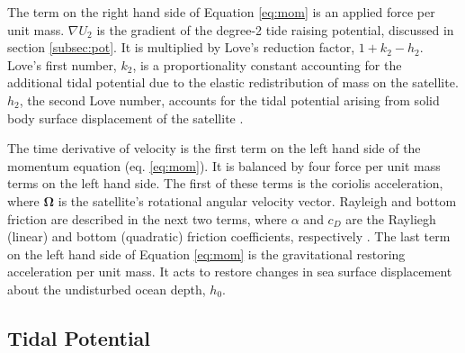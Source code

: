 The term on the right hand side of Equation \ref{eq:mom} is an applied force per unit mass. $\nabla U_2$ is the gradient of the degree-2 tide raising potential, discussed in section \ref{subsec:pot}. It is multiplied by Love's reduction factor, $1 + k_2 - h_2$. Love's first number, $k_2$, is a proportionality constant accounting for the additional tidal potential due to the elastic redistribution of mass on the satellite. $h_2$, the second Love number, accounts for the tidal potential arising from solid body surface displacement of the satellite \citep{love1911some}.

The time derivative of velocity is the first term on the left hand side of the momentum equation (eq. \ref{eq:mom}). It is balanced by four force per unit mass terms on the left hand side. The first of these terms is the coriolis acceleration, where $\bm{\Omega}$ is the satellite's rotational angular velocity vector. Rayleigh and bottom friction are described in the next two terms, where $\alpha$ and $c_D$ are the Rayliegh (linear) and bottom (quadratic) friction coefficients, respectively \citep{sears1995tidal,chen2013tidal}. The last term on the left hand side of Equation \ref{eq:mom} is the gravitational restoring acceleration per unit mass. It acts to restore changes in sea surface displacement about the undisturbed ocean depth, $h_0$.

\subsection{Tidal Potential \label{subsec:pot}}

